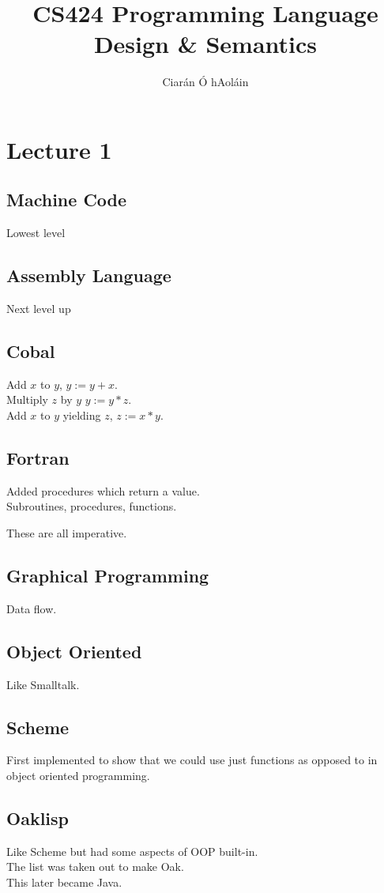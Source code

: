 \documentclass[12pt]{article}
\title{CS424 Programming Language Design \& Semantics}
\author{Ciarán Ó hAoláin}
\begin{document}
	\maketitle
	\section[L1]{Lecture 1}
	
	\subsection{Machine Code}
	Lowest level
	
	\subsection{Assembly Language}
	Next level up
	
	\subsection{Cobal}
	Add $x$ to $y$, $y :=y+x$. \\
	Multiply $z$ by $y$ $y:=y*z$. \\ 	
	Add $x$ to $y$ yielding $z$, $z := x*y$.
	
	\subsection{Fortran}
	Added procedures which return a value.\\
	Subroutines, procedures, functions.
	
	These are all imperative.
	
	\subsection{Graphical Programming}
	Data flow.
	
	\subsection{Object Oriented}
	Like Smalltalk. 
	
	\subsection{Scheme}
	First implemented to show that we could use just functions as opposed to in object oriented programming.
	
	\subsection{Oaklisp}
	Like Scheme but had some aspects of OOP built-in.\\
	The list was taken out to make Oak.\\
	This later became Java.
	
\end{document}
